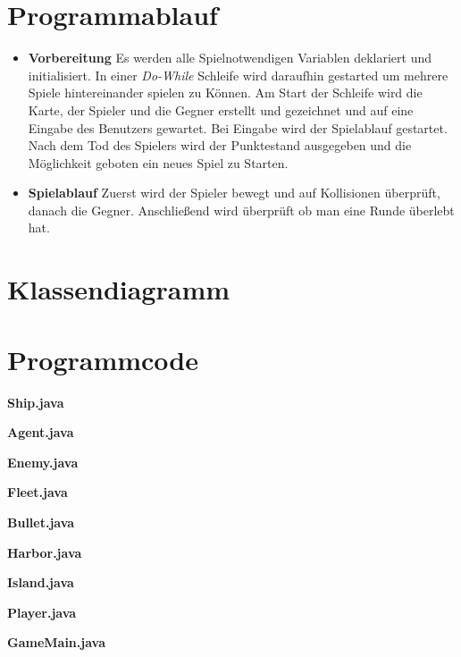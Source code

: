 \documentclass{article}
\begin{document}
\section{Programmablauf}
\begin{itemize}
    \item \textbf{Vorbereitung}
        \newline
        Es werden alle Spielnotwendigen Variablen deklariert und initialisiert. In einer \textit{Do-While} Schleife wird daraufhin gestarted um mehrere Spiele hintereinander spielen zu Können. Am Start der Schleife wird die Karte, der Spieler und die Gegner erstellt und gezeichnet und auf eine Eingabe des Benutzers gewartet. Bei Eingabe wird der Spielablauf gestartet. Nach dem Tod des Spielers wird der Punktestand ausgegeben und die Möglichkeit geboten ein neues Spiel zu Starten.
    \item \textbf{Spielablauf}
        \newline
        Zuerst wird der Spieler bewegt und auf Kollisionen überprüft, danach die Gegner. Anschließend wird überprüft ob man eine Runde überlebt hat.
\end{itemize}
\newpage

\section{Klassendiagramm}
\newpage
\section{Programmcode}
\textbf{Ship.java}

\newpage
\textbf{Agent.java}

\newpage
\textbf{Enemy.java}

\newpage
\textbf{Fleet.java}

\newpage
\textbf{Bullet.java}

\newpage
\textbf{Harbor.java}

\newpage
\textbf{Island.java}

\newpage
\textbf{Player.java}

\newpage
\textbf{GameMain.java}

\end{document}
